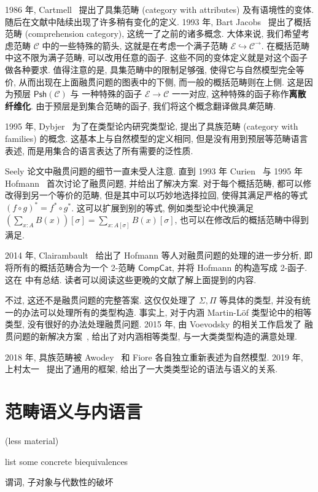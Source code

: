 1986 年, Cartmell~\cite{cartmell:1986:contextualcat}
提出了具集范畴 (category with attributes) 及有语境性的变体.
随后在文献中陆续出现了许多稍有变化的定义.
1993 年, Bart Jacobs~\cite{jacobs:1993:comprehensioncat}
提出了概括范畴 (comprehension category), 这统一了之前的诸多概念.
大体来说, 我们希望考虑范畴 \(\mathcal{C}\) 中的一些特殊的箭头,
这就是在考虑一个满子范畴 \(\mathcal{E} \hookrightarrow \mathcal{C}^\to\).
在概括范畴中这不限为满子范畴, 可以改用任意的函子.
这些不同的变体定义就是对这个函子做各种要求.
值得注意的是, 具集范畴中的限制足够强, 使得它与自然模型完全等价,
从而出现在上面融贯问题的图表中的下侧, 而一般的概括范畴则在上侧.
这是因为预层 \(\mathsf{Psh}(\mathcal{C})\) 与
一种特殊的函子 \(\mathcal{E} \to \mathcal{C}\) 一一对应,
这种特殊的函子称作\textbf{离散纤维化}.
由于预层是到集合范畴的函子, 我们将这个概念翻译做具\emph{集}范畴.

1995 年, Dybjer~\cite{dybjer:1995:internal}
为了在类型论内研究类型论, 提出了具族范畴 (category with families) 的概念.
这基本上与自然模型的定义相同, 但是没有用到预层等范畴语言表述,
而是用集合的语言表达了所有需要的泛性质.

Seely 论文中融贯问题的细节一直未受人注意.
直到 1993 年 Curien~\cite{curien:1993:coherence} 与
1995 年 Hofmann~\cite{hofmann:1995:lccccoh}
首次讨论了融贯问题, 并给出了解决方案.
对于每个概括范畴, 都可以修改得到另一个等价的范畴,
但是其中可以巧妙地选择拉回, 使得其满足严格的等式 \((f \circ g)^* = f^* \circ g^*\).
这可以扩展到别的等式, 例如类型论中代换满足
\((\sum_{x : A} B(x))[\sigma] = \sum_{x : A[\sigma]} B(x)[\sigma]\),
也可以在修改后的概括范畴中得到满足.

2014 年, Clairambault~\cite{clairambault:2014:biequivalence}
给出了 Hofmann 等人对融贯问题的处理的进一步分析,
即将所有的概括范畴合为一个 2-范畴 \(\mathsf{CompCat}\),
并将 Hofmann 的构造写成 2-函子.
这在 \cite{curien:2014:revisit} 中有总结.
读者可以阅读这些更晚的文献了解上面提到的内容.

不过, 这还不是融贯问题的完整答案.
这仅仅处理了 \(\Sigma, \Pi\) 等具体的类型,
并没有统一的办法可以处理所有的类型构造.
事实上, 对于内涵 Martin-Löf 类型论中的相等类型,
没有很好的办法处理融贯问题.
2015 年, 由 Voevodsky 的相关工作启发了
融贯问题的新解决方案~\cite{lumsdaine:2015:universes},
给出了对内涵相等类型, 与一大类类型构造的满意处理.

2018 年, 具族范畴被 Awodey~\cite{awodey:2018:natural} 和 Fiore 各自独立重新表述为自然模型.
2019 年, 上村太一~\cite{uemura:2019:general}
提出了通用的框架, 给出了一大类类型论的语法与语义的关系.

\section{范畴语义与内语言}\label{category:inner}

(less material)

list some concrete biequivalences

谓词, 子对象与代数性的破坏

